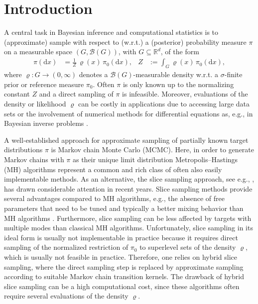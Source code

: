\documentclass[sn-mathphys-num]{sn-jnl}%
\theoremstyle{thmstyleone}%
\theoremstyle{thmstyletwo}%
\theoremstyle{thmstylethree}%
\begin{document}
\section{Introduction}\label{introduction}

A central task in Bayesian inference and computational statistics is to (approximate) sample with respect to (w.r.t.) a (posterior) probability measure $\pi$ on a measurable space $(G,\mathcal{B}(G))$, with $G\subseteq\mathbb{R}^d$, of the form
\begin{align}\label{PMLR:distribution}
	\pi(\mathrm{d}x) 
	& = \frac {1}{Z} \, \varrho(x) \, \pi_0(\mathrm{d}x), 
	& Z & :=\int_G^{} \varrho(x)  \, \pi_0(\mathrm{d}x),
\end{align}      
where $\varrho\colon G \to (0,\infty)$ denotes a $\mathcal{B}(G)$-measurable density w.r.t. a $\sigma$-finite prior or reference measure $\pi_0$.
Often $\pi$ is only known up to the normalizing constant $Z$ and a direct sampling of $\pi$ is infeasible.
Moreover, evaluations of the density or likelihood $\varrho$ can be costly in applications due to accessing large data sets or the involvement of numerical methods for differential equations as, e.g., in Bayesian inverse problems \cite{Stuart2010}.

A well-established approach for approximate sampling of partially known target distributions $\pi$ is Markov chain Monte Carlo (MCMC). 
Here, in order to generate Markov chains with $\pi$ as their unique limit distribution Metropolis--Hastings (MH) algorithms \cite{MetropolisEtAl1953, RobertsRosenthal2004} represent a common and rich class of often also easily implementable methods. 
As an alternative, the slice sampling approach, see e.g., \cite{Neal2003}, has drawn considerable attention in recent years. 
Slice sampling methods provide several advantages compared to MH algorithms, e.g., the absence of free parameters that need to be tuned and typically a better mixing behavior than MH algorithms \cite{RudolfUllrich2018}.
Furthermore, slice sampling can be less affected by targets with multiple modes than classical MH algorithms. 
Unfortunately, slice sampling in its ideal form is usually not implementable in practice because it requires direct sampling of the normalized restriction of $\pi_0$ to superlevel sets of the density $\varrho$, which is usually not feasible in practice. %
Therefore, one relies on hybrid slice sampling, where the direct sampling step is replaced by approximate sampling according to suitable Markov chain transition kernels.
The drawback of hybrid slice sampling can be a high computational cost, since these algorithms often require several evaluations of the density $\varrho$.
\end{document}
